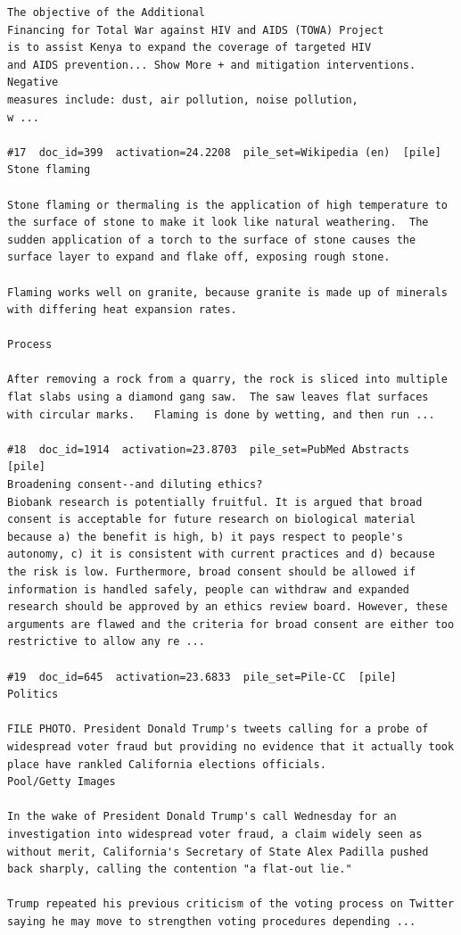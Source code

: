 \begin{verbatim}
The objective of the Additional
Financing for Total War against HIV and AIDS (TOWA) Project
is to assist Kenya to expand the coverage of targeted HIV
and AIDS prevention... Show More + and mitigation interventions. Negative
measures include: dust, air pollution, noise pollution,
w ...

#17  doc_id=399  activation=24.2208  pile_set=Wikipedia (en)  [pile]
Stone flaming

Stone flaming or thermaling is the application of high temperature to the surface of stone to make it look like natural weathering.  The sudden application of a torch to the surface of stone causes the surface layer to expand and flake off, exposing rough stone.    

Flaming works well on granite, because granite is made up of minerals with differing heat expansion rates.

Process

After removing a rock from a quarry, the rock is sliced into multiple flat slabs using a diamond gang saw.  The saw leaves flat surfaces with circular marks.   Flaming is done by wetting, and then run ...

#18  doc_id=1914  activation=23.8703  pile_set=PubMed Abstracts  [pile]
Broadening consent--and diluting ethics?
Biobank research is potentially fruitful. It is argued that broad consent is acceptable for future research on biological material because a) the benefit is high, b) it pays respect to people's autonomy, c) it is consistent with current practices and d) because the risk is low. Furthermore, broad consent should be allowed if information is handled safely, people can withdraw and expanded research should be approved by an ethics review board. However, these arguments are flawed and the criteria for broad consent are either too restrictive to allow any re ...

#19  doc_id=645  activation=23.6833  pile_set=Pile-CC  [pile]
Politics

FILE PHOTO. President Donald Trump's tweets calling for a probe of widespread voter fraud but providing no evidence that it actually took place have rankled California elections officials.
Pool/Getty Images

In the wake of President Donald Trump's call Wednesday for an investigation into widespread voter fraud, a claim widely seen as without merit, California's Secretary of State Alex Padilla pushed back sharply, calling the contention "a flat-out lie."

Trump repeated his previous criticism of the voting process on Twitter saying he may move to strengthen voting procedures depending ...


\end{verbatim}
